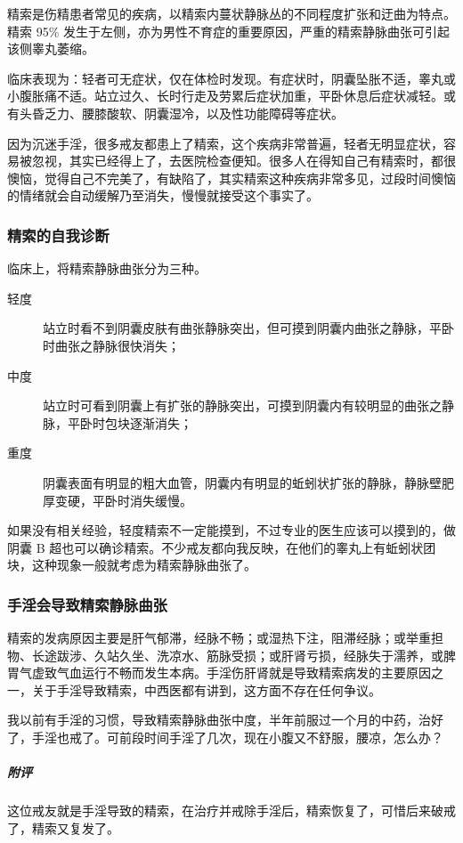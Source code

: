 精索是伤精患者常见的疾病，以精索内蔓状静脉丛的不同程度扩张和迂曲为特点。精索 95\% 发生于左侧，亦为男性不育症的重要原因，严重的精索静脉曲张可引起该侧睾丸萎缩。

临床表现为：轻者可无症状，仅在体检时发现。有症状时，阴囊坠胀不适，睾丸或小腹胀痛不适。站立过久、长时行走及劳累后症状加重，平卧休息后症状减轻。或有头昏乏力、腰膝酸软、阴囊湿冷，以及性功能障碍等症状。

因为沉迷手淫，很多戒友都患上了精索，这个疾病非常普遍，轻者无明显症状，容易被忽视，其实已经得上了，去医院检查便知。很多人在得知自己有精索时，都很懊恼，觉得自己不完美了，有缺陷了，其实精索这种疾病非常多见，过段时间懊恼的情绪就会自动缓解乃至消失，慢慢就接受这个事实了。

\subsubsection{精索的自我诊断}

临床上，将精索静脉曲张分为三种。

\begin{description}
    \item[轻度] 站立时看不到阴囊皮肤有曲张静脉突出，但可摸到阴囊内曲张之静脉，平卧时曲张之静脉很快消失；
    \item[中度] 站立时可看到阴囊上有扩张的静脉突出，可摸到阴囊内有较明显的曲张之静脉，平卧时包块逐渐消失；
    \item[重度] 阴囊表面有明显的粗大血管，阴囊内有明显的蚯蚓状扩张的静脉，静脉壁肥厚变硬，平卧时消失缓慢。
\end{description}

如果没有相关经验，轻度精索不一定能摸到，不过专业的医生应该可以摸到的，做阴囊 B 超也可以确诊精索。不少戒友都向我反映，在他们的睾丸上有蚯蚓状团块，这种现象一般就考虑为精索静脉曲张了。

\subsubsection{手淫会导致精索静脉曲张}

精索的发病原因主要是肝气郁滞，经脉不畅；或湿热下注，阻滞经脉；或举重担物、长途跋涉、久站久坐、洗凉水、筋脉受损；或肝肾亏损，经脉失于濡养，或脾胃气虚致气血运行不畅而发生本病。手淫伤肝肾就是导致精索病发的主要原因之一，关于手淫导致精索，中西医都有讲到，这方面不存在任何争议。

\begin{case}[精索静脉曲张]
    我以前有手淫的习惯，导致精索静脉曲张中度，半年前服过一个月的中药，治好了，手淫也戒了。可前段时间手淫了几次，现在小腹又不舒服，腰凉，怎么办？
    \subparagraph{附评} 这位戒友就是手淫导致的精索，在治疗并戒除手淫后，精索恢复了，可惜后来破戒了，精索又复发了。
\end{case}

